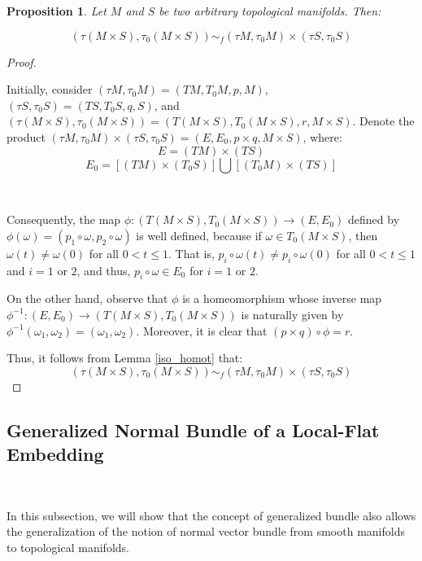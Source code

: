 \documentclass[12pt,oneside]{book}
\newtheorem{prop}   {Proposition}[chapter]
\begin{document}
    \begin{prop}\label{fht_tang_cart}
        Let $M$ and $S$ be two arbitrary topological manifolds. Then:
        
        $$ (\tau (M\times S),\tau_{0}(M\times S))\sim_{f} (\tau M,\tau_{0}M)\times (\tau S,\tau_{0}S) $$
    \end{prop}
    \begin{proof}

    \

    Initially, consider $(\tau M,\tau_{0}M)=(TM,T_{0}M,p,M)$, $(\tau S,\tau_{0}S)=(TS,T_{0}S,q,S)$, and 
    $(\tau (M\times S),\tau_{0}(M\times S))=(T(M\times S),T_{0}(M\times S),r,M\times S)$. Denote the product 
    $(\tau M,\tau_{0}M)\times (\tau S,\tau_{0}S)=(E,E_{0},p\times q,M\times S)$, where:
    $$ E=(TM)\times(TS) $$
    $$ E_{0}=[(TM)\times (T_{0}S)]\bigcup [(T_{0}M)\times (TS)] $$

    \

    Consequently, the map $\phi:(T(M\times S),T_{0}(M\times S))\to (E,E_{0})$ defined by $\phi(\omega)=(p_{1}\circ\omega,p_{2}\circ\omega)$ 
    is well defined, because if $\omega\in T_{0}(M\times S)$, then $\omega(t)\neq \omega(0)$ for all $0<t\leq 1$. That is, $p_{i}\circ\omega(t)\neq p_{i}\circ\omega(0)$ for all $0<t\leq 1$ and $i=1$ or $2$, and thus, $p_{i}\circ\omega\in E_{0}$ for $i=1$ or $2$.

    On the other hand, observe that $\phi$ is a homeomorphism whose inverse map $\phi^{-1}:(E,E_{0})\to (T(M\times S),T_{0}(M\times S))$ is 
    naturally given by $\phi^{-1}(\omega_{1},\omega_{2})=(\omega_{1},\omega_{2})$. Moreover, it is clear that $(p\times q)\circ\phi=r$.

    Thus, it follows from Lemma \ref{iso_homot} that:
    $$(\tau (M\times S),\tau_{0}(M\times S))\sim_{f} (\tau M,\tau_{0}M)\times (\tau S,\tau_{0}S)$$

    \end{proof}



    \subsection{Generalized Normal Bundle of a Local-Flat Embedding}\label{secao_fht_normal}

    \

    In this subsection, we will show that the concept of generalized bundle also allows the generalization of the 
    notion of normal vector bundle from smooth manifolds to topological 
    manifolds.
\end{document}
